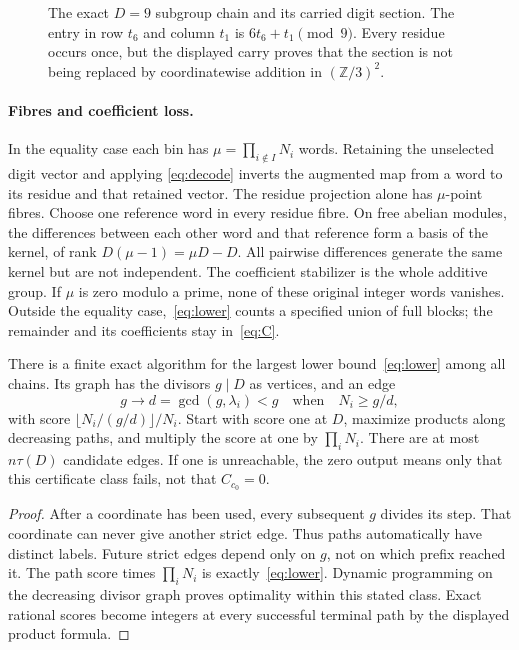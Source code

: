 \begin{figure}[ht]
\centering

\caption{The exact $D=9$ subgroup chain and its carried digit section. The
entry in row $t_6$ and column $t_1$ is $6t_6+t_1\pmod9$. Every residue occurs
once, but the displayed carry proves that the section is not being replaced by
coordinatewise addition in $(\mathbb Z/3)^2$.}
\label{fig:mixed-chain}
\end{figure}

\paragraph{Fibres and coefficient loss.}
In the equality case each bin has
$\mu=\prod_{i\notin I}N_i$ words. Retaining the unselected digit vector and
applying \eqref{eq:decode} inverts the augmented map from a word to its residue
and that retained vector. The residue projection alone has $\mu$-point fibres.
Choose one reference word in every residue fibre. On free abelian modules, the
differences between each other word and that reference form a basis of the
kernel, of rank $D(\mu-1)=\mu D-D$. All pairwise differences generate the same
kernel but are not independent. The coefficient stabilizer is the whole
additive group.
If $\mu$ is zero modulo a prime, none of these original integer words vanishes.
Outside the equality case,~\eqref{eq:lower} counts a specified union of full
blocks; the remainder and its coefficients stay in~\eqref{eq:C}.

\begin{proposition}\label{prop:dag}
There is a finite exact algorithm for the largest lower bound~\eqref{eq:lower}
among all chains. Its graph has the divisors $g\mid D$ as vertices, and an edge
\[
 g\longrightarrow d=\gcd(g,\lambda_i)<g
 \quad\text{when}\quad N_i\ge g/d,
\]
with score $\lfloor N_i/(g/d)\rfloor/N_i$.
Start with score one at $D$, maximize products along decreasing paths, and
multiply the score at one by $\prod_iN_i$.
There are at most $n\tau(D)$ candidate edges. If one is unreachable, the zero
output means only that this certificate class fails, not that $C_{c_0}=0$.
\end{proposition}
\begin{proof}
After a coordinate has been used, every subsequent $g$ divides its step.
That coordinate can never give another strict edge. Thus paths automatically
have distinct labels. Future strict edges depend only on $g$, not on which
prefix reached it. The path score times $\prod_iN_i$ is exactly~\eqref{eq:lower}.
Dynamic programming on the decreasing divisor graph proves optimality within
this stated class. Exact rational scores become integers at every successful
terminal path by the displayed product formula.
\end{proof}

